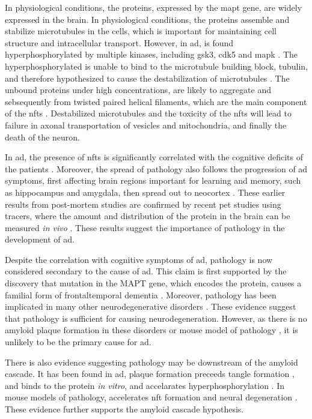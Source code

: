 In physiological conditions, the \atau proteins, expressed by the \gls{mapt} gene, are widely expressed in the brain. In physiological conditions, the \atau proteins assemble and stabilize microtubules in the cells, which is important for maintaining cell structure and intracellular transport. However, in \gls{ad}, \atau is found hyperphosphorylated by multiple kinases, including \gls{gsk3}, \gls{cdk5} and \gls{mapk} \citep{singh94}. The hyperphosphorylated \atau is unable to bind to the microtubule building block, tubulin, and therefore hypothesized to cause the destabilization of microtubules \citep{bramblett93, yoshida93, alonso94}. The unbound \atau proteins under high concentrations, are likely to aggregate and sebsequently from twisted paired helical filaments, which are the main component of the \glspl{nft} \citep{kidd63, kuret05}. Destabilized microtubules and the toxicity of the \glspl{nft} will lead to failure in axonal transportation of vesicles and mitochondria, and finally the death of the neuron.

In \gls{ad}, the presence of \glspl{nft} is significantly correlated with the cognitive deficits of the patients \citep{hyman12}. Moreover, the spread of \atau pathology also follows the progression of \gls{ad} symptoms, first affecting brain regions important for learning and memory, such as hippocampus and amygdala, then spread out to neocortex \citep{braak91}. These earlier results from post-mortem studies are confirmed by recent \gls{pet} studies using \atau tracers, where the amount and distribution of the \atau protein in the brain can be measured \textit{in vivo} \citep{ossenkoppele16, scholl16}. These results suggest the importance of \atau pathology in the development of \gls{ad}.

Despite the correlation with cognitive symptoms of \gls{ad}, \atau pathology is now considered secondary to the cause of \gls{ad}. This claim is first supported by the discovery that mutation in the MAPT gene, which encodes the \atau protein, causes a familial form of frontaltemporal dementia \citep{hutton98, poorkaj98}. Moreover, \atau pathology has been implicated in many other neurodegenerative disorders \citep[e.g.][]{williams09, mckee16}. These evidence suggest that \atau pathology is sufficient for causing neurodegeneration. However, as there is no amyloid plaque formation in these disorders or mouse model of \atau pathology \citep{gotz04}, it is unlikely to be the primary cause for \gls{ad}.

There is also evidence suggesting \atau pathology may be downstream of the amyloid cascade. It has been found in \gls{ad}, plaque formation preceeds tangle formation \citep{price99}, and \abeta binds to the \atau protein \textit{in vitro}, and accelarates \atau hyperphosphorylation \citep{guo06, zempel10}. In mouse models of \atau pathology, \abeta accelerates \gls{nft} formation and neural degeneration \citep{lewis01, terwel08}. These evidence further supports the amyloid cascade hypothesis. 

